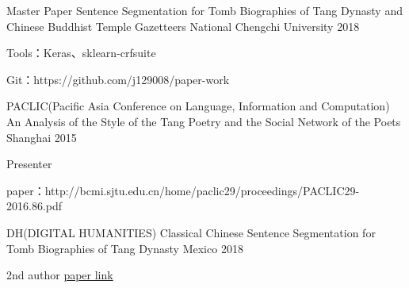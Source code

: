 

\begin{cventries}
  \cventry
    {Master Paper} %
    {Sentence Segmentation for Tomb Biographies of Tang Dynasty and Chinese Buddhist Temple Gazetteers} %
    {National Chengchi University} %
    {2018} %
    {
      \begin{cvitems} %
        \item {Tools：Keras、sklearn-crfsuite}
        \item {Git：https://github.com/j129008/paper-work}
      \end{cvitems}
    }


  \cventry
    {PACLIC(Pacific Asia Conference on Language, Information and Computation)} %
    {An Analysis of the Style of the Tang Poetry and the Social Network of the Poets}
    {Shanghai} %
    {2015} %
    {
      \begin{cvitems} %
        \item {Presenter} %
        \item {paper：http://bcmi.sjtu.edu.cn/home/paclic29/proceedings/PACLIC29-2016.86.pdf}
      \end{cvitems}
    }


  \cventry
    {DH(DIGITAL HUMANITIES)} %
    {Classical Chinese Sentence Segmentation for Tomb Biographies of Tang Dynasty} %
    {Mexico} %
    {2018} %
    {
      \begin{cvitems} %
      \item {2nd author} %
      \href {https://dh2018.adho.org/classical-chinese-sentence-segmentation-for-tomb-biographies-of-tang-dynasty/}{paper link}
      \end{cvitems}
    }

\end{cventries}
